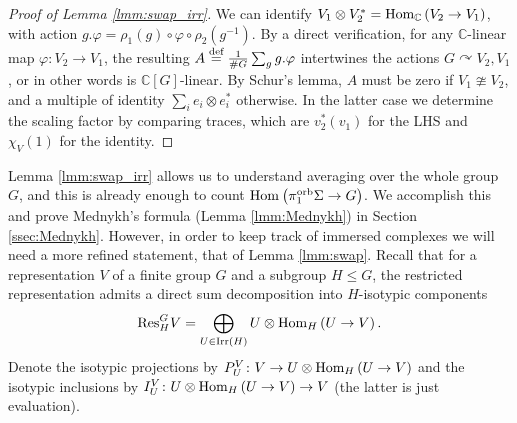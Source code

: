 \documentclass{amsart}
\newcommand{\defeq}{\stackrel{\tn{def}}{=}}
\newcommand{\Hom}[3][]{\tn{Hom}_{#1}\left(#2\to #3\right)}
\newcommand{\pio}{\pi_1^{\textnormal{orb}}}
\newcommand{\tn}{\textnormal}
\begin{document}
\begin{proof}[Proof of Lemma \ref{lmm:swap_irr}]
We can identify $V_1\otimes V_2^*=\Hom[\mathbb{C}]{V_2}{V_1}$, with action $g.\varphi=\rho_1(g)\circ\varphi\circ\rho_2(g^{-1})$. By a direct verification, for any $\mathbb{C}$-linear map $\varphi\colon V_2\to V_1$, the resulting $A\defeq\tfrac{1}{\#G}\sum_gg.\varphi$ intertwines the actions $G\curvearrowright V_2,V_1$, or in other words is $\mathbb{C}[G]$-linear. By Schur's lemma, $A$ must be zero if $V_1\ncong V_2$, and a multiple of identity $\sum_ie_i\otimes e_i^*$ otherwise. In the latter case we determine the scaling factor by comparing traces, which are $v_2^*(v_1)$ for the LHS and $\chi_V(1)$ for the identity.
\end{proof}

Lemma \ref{lmm:swap_irr} allows us to understand averaging over the whole group $G$, and this is already enough to count $\Hom{\pio\Sigma}{G}$. We accomplish this and prove Mednykh's formula (Lemma \ref{lmm:Mednykh}) in Section \ref{ssec:Mednykh}. However, in order to keep track of immersed complexes we will need a more refined statement, that of Lemma \ref{lmm:swap}. Recall that for a representation $V$ of a finite group $G$ and a subgroup $H\leq G$, the restricted representation admits a direct sum decomposition into $H$-isotypic components
\begin{equation}\label{eq:isotypic}
\tn{Res}^G_HV=\bigoplus_{U\in\tn{Irr}(H)}U\otimes\Hom[H]{U}{V}.
\end{equation}
Denote the isotypic projections by $P^V_U\colon V\to U\otimes\Hom[H]{U}{V}$ and the isotypic inclusions by $I^V_U\colon U\otimes\Hom[H]{U}{V}\to V$ (the latter is just evaluation).
\end{document}

